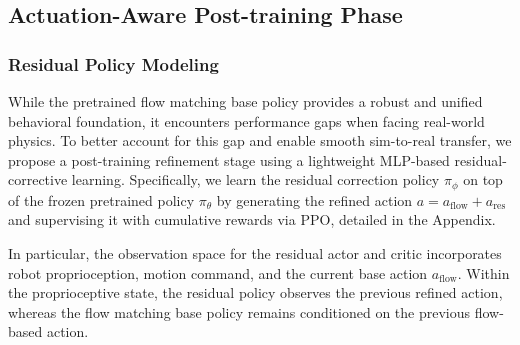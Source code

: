 \subsection{Actuation-Aware Post-training Phase}

 \subsubsection{Residual Policy Modeling} While the pretrained flow matching base policy provides a robust and unified behavioral foundation, it encounters performance gaps when facing real-world physics. To better account for this gap and enable smooth sim-to-real transfer, we propose a post-training refinement stage using a lightweight MLP-based residual-corrective learning. Specifically, we learn the residual correction policy $\pi_\phi$ on top of the frozen pretrained policy $\pi_\theta$ by generating the refined action $a = a_{\text{flow}} + a_{\text{res}}$ and supervising it with cumulative rewards via PPO, detailed in the Appendix. 

In particular, the observation space for the residual actor and critic incorporates robot proprioception, motion command, and the current base action $a_\text{flow}$. Within the proprioceptive state, the residual policy observes the previous refined action, whereas the flow matching base policy remains conditioned on the previous flow-based action.
 


